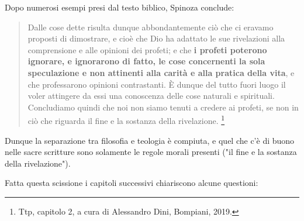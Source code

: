 Dopo numerosi esempi presi dal testo biblico, Spinoza conclude:

\begin{quotation}
	\small Dalle cose dette risulta dunque abbondantemente ciò che ci eravamo proposti di
	dimostrare, e cioè che Dio ha adattato le sue rivelazioni alla comprensione e alle opinioni dei
	profeti; e che \textbf{i profeti poterono ignorare, e ignorarono di fatto, le cose concernenti la sola
	speculazione e non attinenti alla carità e alla pratica della vita}, e che professarono opinioni
	contrastanti. È dunque del tutto fuori luogo il voler attingere da essi una conoscenza delle cose
	naturali e spirituali. Concludiamo quindi che noi non siamo tenuti a credere ai profeti, se non in ciò
	che riguarda il fine e la sostanza della rivelazione. \footnote{Ttp, capitolo 2, a cura di Alessandro Dini, Bompiani, 2019.}
\end{quotation}

Dunque la separazione tra filosofia e teologia è compiuta, e quel che c'è di buono nelle sacre scritture sono solamente le regole morali presenti ("il fine e la sostanza della rivelazione").

Fatta questa scissione i capitoli successivi chiariscono alcune questioni:

